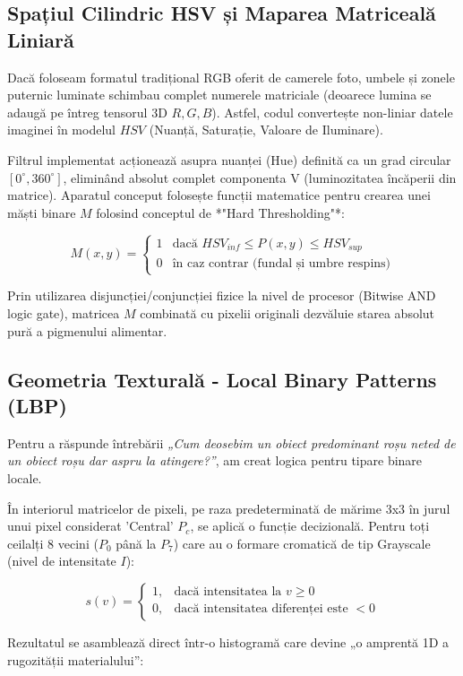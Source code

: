 \documentclass[12pt,a4paper]{article}
\begin{document}
\subsection{Spațiul Cilindric HSV și Maparea Matriceală Liniară}
Dacă foloseam formatul tradițional RGB oferit de camerele foto, umbele și zonele puternic luminate schimbau complet numerele matriciale (deoarece lumina se adaugă pe întreg tensorul 3D $R, G, B$). Astfel, codul convertește non-liniar datele imaginei în modelul $HSV$ (Nuanță, Saturație, Valoare de Iluminare).

Filtrul implementat acționează asupra nuanței (Hue) definită ca un grad circular $[0^\circ, 360^\circ]$, eliminând absolut complet componenta V (luminozitatea încăperii din matrice). 
Aparatul conceput folosește funcții matematice pentru crearea unei măști binare $M$ folosind conceptul de *"Hard Thresholding"*:

\[
M(x,y) = \begin{cases} 
1 & \text{dacă } HSV_{inf} \le P(x,y) \le HSV_{sup} \\ 
0 & \text{în caz contrar (fundal și umbre respins)} 
\end{cases}
\]

Prin utilizarea disjuncției/conjuncției fizice la nivel de procesor (Bitwise AND logic gate), matricea $M$ combinată cu pixelii originali dezvăluie starea absolut pură a pigmenului alimentar.

\subsection{Geometria Texturală - Local Binary Patterns (LBP)}
Pentru a răspunde întrebării \textit{„Cum deosebim un obiect predominant roșu neted de un obiect roșu dar aspru la atingere?”}, am creat logica pentru tipare binare locale.

În interiorul matricelor de pixeli, pe raza predeterminată de mărime 3x3 în jurul unui pixel considerat 'Central' $P_c$, se aplică o funcție decizională. Pentru toți ceilalți 8 vecini ($P_0$ până la $P_7$) care au o formare cromatică de tip Grayscale (nivel de intensitate $I$):

\[
s(v) = \begin{cases} 
1, & \text{dacă intensitatea la } v \ge 0 \\ 
0, & \text{dacă intensitatea diferenței este } < 0 
\end{cases}
\]

Rezultatul se asamblează direct într-o histogramă care devine „o amprentă 1D a rugozității materialului”:
\end{document}

